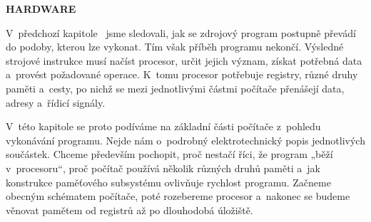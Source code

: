 \documentclass[11pt,a4paper,oneside]{article}
\begin{document}
\begin{center}
    {\huge \textbf{\MakeUppercase{Hardware}}}\\[1.2cm]
\end{center}

V~předchozí kapitole~ jsme sledovali, jak se zdrojový program postupně převádí do podoby, kterou lze vykonat. Tím však příběh programu nekončí. Výsledné strojové instrukce musí načíst procesor, určit jejich význam, získat potřebná data a~provést požadované operace. K~tomu procesor potřebuje registry, různé druhy paměti a~cesty, po nichž se mezi jednotlivými částmi počítače přenášejí data, adresy a~řídicí signály.

V~této kapitole se proto podíváme na základní části počítače z~pohledu vykonávání programu. Nejde nám o~podrobný elektrotechnický popis jednotlivých součástek. Chceme především pochopit, proč nestačí říci, že program „běží v~procesoru“, proč počítač používá několik různých druhů paměti a~jak konstrukce paměťového subsystému ovlivňuje rychlost programu. Začneme obecným schématem počítače, poté rozebereme procesor a~nakonec se budeme věnovat pamětem od registrů až po dlouhodobá úložiště.







\end{document}
